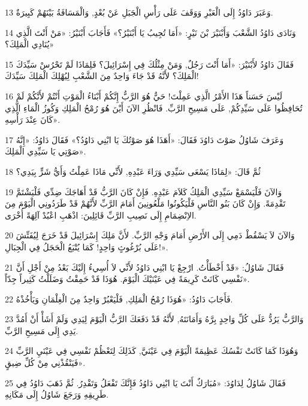 \par 13 وَعَبَرَ دَاوُدُ إِلَى الْعَبْرِ وَوَقَفَ عَلَى رَأْسِ الْجَبَلِ عَنْ بُعْدٍ, وَالْمَسَافَةُ بَيْنَهُمْ كَبِيرَةٌ.
\par 14 وَنَادَى دَاوُدُ الشَّعْبَ وَأَبْنَيْرَ بْنَ نَيْرٍ: «أَمَا تُجِيبُ يَا أَبْنَيْرُ؟» فَأَجَابَ أَبْنَيْرُ: «مَنْ أَنْتَ الَّذِي يُنَادِي الْمَلِكَ؟»
\par 15 فَقَالَ دَاوُدُ لأَبْنَيْرَ: «أَمَا أَنْتَ رَجُلٌ, وَمَنْ مِثْلُكَ فِي إِسْرَائِيلَ؟ فَلِمَاذَا لَمْ تَحْرُسْ سَيِّدَكَ الْمَلِكَ؟ لأَنَّهُ قَدْ جَاءَ وَاحِدٌ مِنَ الشَّعْبِ لِيُهْلِكَ الْمَلِكَ سَيِّدَكَ!
\par 16 لَيْسَ حَسَناً هَذَا الأَمْرُ الَّذِي عَمِلْتَ! حَيٌّ هُوَ الرَّبُّ إِنَّكُمْ أَبْنَاءُ الْمَوْتِ أَنْتُمْ لأَنَّكُمْ لَمْ تُحَافِظُوا عَلَى سَيِّدِكُمْ, عَلَى مَسِيحِ الرَّبِّ. فَانْظُرِ الآنَ أَيْنَ هُوَ رُمْحُ الْمَلِكِ وَكُوزُ الْمَاءِ الَّذِي كَانَ عِنْدَ رَأْسِهِ».
\par 17 وَعَرَفَ شَاوُلُ صَوْتَ دَاوُدَ فَقَالَ: «أَهَذَا هُوَ صَوْتُكَ يَا ابْنِي دَاوُدُ؟» فَقَالَ دَاوُدُ: «إِنَّهُ صَوْتِي يَا سَيِّدِي الْمَلِكَ».
\par 18 ثُمَّ قَالَ: «لِمَاذَا يَسْعَى سَيِّدِي وَرَاءَ عَبْدِهِ, لأَنِّي مَاذَا عَمِلْتُ وَأَيُّ شَرٍّ بِيَدِي؟
\par 19 وَالآنَ فَلْيَسْمَعْ سَيِّدِي الْمَلِكُ كَلاَمَ عَبْدِهِ. فَإِنْ كَانَ الرَّبُّ قَدْ أَهَاجَكَ ضِدِّي فَلْيَشْتَمَّ تَقْدِمَةً. وَإِنْ كَانَ بَنُو النَّاسِ فَلْيَكُونُوا مَلْعُونِينَ أَمَامَ الرَّبِّ لأَنَّهُمْ قَدْ طَرَدُونِي الْيَوْمَ مِنَ الاِنْضِمَامِ إِلَى نَصِيبِ الرَّبِّ قَائِلِينَ: اذْهَبِ اعْبُدْ آلِهَةً أُخْرَى.
\par 20 وَالآنَ لاَ يَسْقُطْ دَمِي إِلَى الأَرْضِ أَمَامَ وَجْهِ الرَّبِّ. لأَنَّ مَلِكَ إِسْرَائِيلَ قَدْ خَرَجَ لِيُفَتِّشَ عَلَى بُرْغُوثٍ وَاحِدٍ! كَمَا يُتْبَعُ الْحَجَلُ فِي الْجِبَالِ!».
\par 21 فَقَالَ شَاوُلُ: «قَدْ أَخْطَأْتُ. ارْجِعْ يَا ابْنِي دَاوُدُ لأَنِّي لاَ أُسِيءُ إِلَيْكَ بَعْدُ مِنْ أَجْلِ أَنَّ نَفْسِي كَانَتْ كَرِيمَةً فِي عَيْنَيْكَ الْيَوْمَ. هُوَذَا قَدْ حَمِقْتُ وَضَلَلْتُ كَثِيراً جِدّاً».
\par 22 فَأَجَابَ دَاوُدُ: «هُوَذَا رُمْحُ الْمَلِكِ, فَلْيَعْبُرْ وَاحِدٌ مِنَ الْغِلْمَانِ وَيَأْخُذْهُ.
\par 23 وَالرَّبُّ يَرُدُّ عَلَى كُلِّ وَاحِدٍ بِرَّهُ وَأَمَانَتَهُ, لأَنَّهُ قَدْ دَفَعَكَ الرَّبُّ الْيَوْمَ لِيَدِي وَلَمْ أَشَأْ أَنْ أَمُدَّ يَدِي إِلَى مَسِيحِ الرَّبِّ.
\par 24 وَهُوَذَا كَمَا كَانَتْ نَفْسُكَ عَظِيمَةً الْيَوْمَ فِي عَيْنَيَّ, كَذَلِكَ لِتَعْظُمْ نَفْسِي فِي عَيْنَيِ الرَّبِّ فَيَنْقُذْنِي مِنْ كُلِّ ضِيقٍ».
\par 25 فَقَالَ شَاوُلُ لِدَاوُدَ: «مُبَارَكٌ أَنْتَ يَا ابْنِي دَاوُدُ فَإِنَّكَ تَفْعَلُ وَتَقْدِرُ. ثُمَّ ذَهَبَ دَاوُدُ فِي طَرِيقِهِ وَرَجَعَ شَاوُلُ إِلَى مَكَانِهِ.

